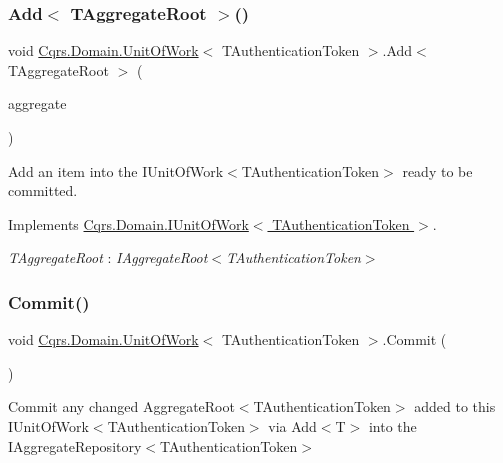 \subsubsection{\texorpdfstring{Add$<$ T\+Aggregate\+Root $>$()}{Add< TAggregateRoot >()}}
{\footnotesize\ttfamily void \hyperlink{classCqrs_1_1Domain_1_1UnitOfWork}{Cqrs.\+Domain.\+Unit\+Of\+Work}$<$ T\+Authentication\+Token $>$.Add$<$ T\+Aggregate\+Root $>$ (\begin{DoxyParamCaption}\item[{T\+Aggregate\+Root}]{aggregate }\end{DoxyParamCaption})}



Add an item into the I\+Unit\+Of\+Work$<$\+T\+Authentication\+Token$>$ ready to be committed. 



Implements \hyperlink{interfaceCqrs_1_1Domain_1_1IUnitOfWork_a786ebca85b4ef7294b98280230ef1397_a786ebca85b4ef7294b98280230ef1397}{Cqrs.\+Domain.\+I\+Unit\+Of\+Work$<$ T\+Authentication\+Token $>$}.

\begin{Desc}
\item[Type Constraints]\begin{description}
\item[{\em T\+Aggregate\+Root} : {\em I\+Aggregate\+Root$<$T\+Authentication\+Token$>$}]\end{description}
\end{Desc}
\mbox{\label{classCqrs_1_1Domain_1_1UnitOfWork_a7401e41dd8ce4457551c252ca6402d31_a7401e41dd8ce4457551c252ca6402d31}} 
\subsubsection{\texorpdfstring{Commit()}{Commit()}}
{\footnotesize\ttfamily void \hyperlink{classCqrs_1_1Domain_1_1UnitOfWork}{Cqrs.\+Domain.\+Unit\+Of\+Work}$<$ T\+Authentication\+Token $>$.Commit (\begin{DoxyParamCaption}{ }\end{DoxyParamCaption})}



Commit any changed Aggregate\+Root$<$\+T\+Authentication\+Token$>$ added to this I\+Unit\+Of\+Work$<$\+T\+Authentication\+Token$>$ via Add$<$\+T$>$ into the I\+Aggregate\+Repository$<$\+T\+Authentication\+Token$>$ 




